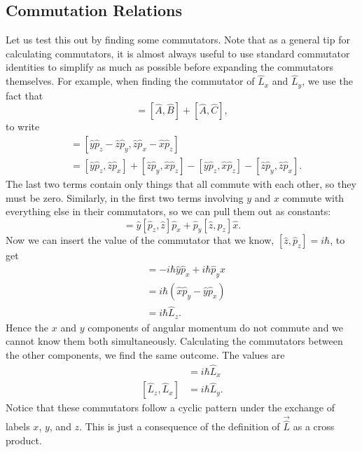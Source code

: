 \documentclass[../quantum_mechanics.tex]{subfiles}
\begin{document}
        \subsection{Commutation Relations}\label{sec:angular-momentum:subsec:commutation-relations}
            Let us test this out by finding some commutators.
            Note that as a general tip for calculating commutators, it is almost always useful to use standard commutator identities to simplify as much as possible before expanding the commutators themselves.
            For example, when finding the commutator of $\hat{L}_x$ and $\hat{L}_y$, we use the fact that
            \begin{equation}
                [\hat{A},\hat{B}+\hat{C}]=[\hat{A},\hat{B}]+[\hat{A},\hat{C}],
            \end{equation}
            to write
            \begin{align}
                [\hat{L}_x,\hat{L}_y]&=[\hat{y}\hat{p}_z-\hat{z}\hat{p}_y,\hat{z}\hat{p}_x-\hat{x}\hat{p}_z]\\
                &=[\hat{y}\hat{p}_z,\hat{z}\hat{p}_x]+[\hat{z}\hat{p}_y,\hat{x}\hat{p}_z]-[\hat{y}\hat{p}_z,\hat{x}\hat{p}_z]-[\hat{z}\hat{p}_y,\hat{z}\hat{p}_x].
            \end{align}
            The last two terms contain only things that all commute with each other, so they must be zero.
            Similarly, in the first two terms involving $y$ and $x$ commute with everything else in their commutators, so we can pull them out as constants:
            \begin{equation}
                [\hat{L}_x,\hat{L}_y]=\hat{y}[\hat{p}_z,\hat{z}]\hat{p}_x+\hat{p}_y[\hat{z},\hat{p}_z]\hat{x}.
            \end{equation}
            Now we can insert the value of the commutator that we know, $[\hat{z},\hat{p}_z]=i\hbar$, to get
            \begin{align}
                [\hat{L}_x,\hat{L}_y]&=-i\hbar\hat{y}\hat{p}_x+i\hbar\hat{p}_y\hat{x}\\
                &=i\hbar(\hat{x}\hat{p}_y-\hat{y}\hat{p}_x)\\
                &=i\hbar\hat{L}_z.
            \end{align}
            Hence the $x$ and $y$ components of angular momentum do not commute and we cannot know them both simultaneously.
            Calculating the commutators between the other components, we find the same outcome.
            The values are
            \begin{align}
                [\hat{L}_y,\hat{L}_z]&=i\hbar\hat{L}_x\\
                [\hat{L}_z,\hat{L}_x]&=i\hbar\hat{L}_y.
            \end{align}
            Notice that these commutators follow a cyclic pattern under the exchange of labels $x$, $y$, and $z$.
            This is just a consequence of the definition of $\vec{\hat{L}}$ as a cross product.
\end{document}
